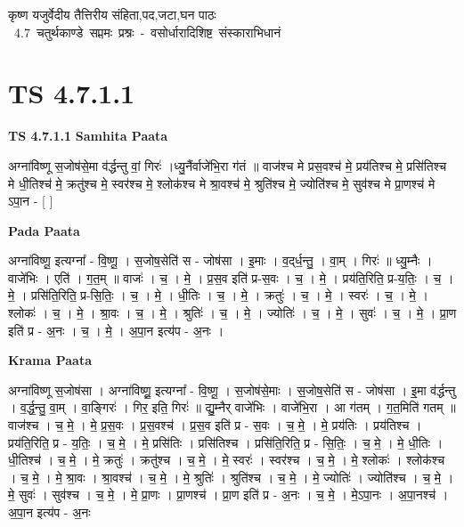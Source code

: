 \documentclass[17pt]{extarticle}
\begin{document}
\begin{titlepage}
    \begin{center}
 
\begin{sanskrit}
    { \Large
    कृष्ण यजुर्वेदीय तैत्तिरीय संहिता,पद,जटा,घन पाठः 
    }
    \\
    \vspace{2.5cm}
    \mbox{ \Large
    4.7     चतुर्थकाण्डे सप्तमः प्रश्नः - वसोर्धारादिशिष्ट संस्काराभिधानं   }
\end{sanskrit}
\end{center}

\end{titlepage}
\tableofcontents
{}
\pagebreak


\section{ TS 4.7.1.1 }

\textbf{TS 4.7.1.1 } \newline
\textbf{Samhita Paata} \newline

अग्ना॑विष्णू स॒जोष॑से॒मा व॑र्द्धन्तु वां॒ गिरः॑ ।ध्यु॒नैंर्वाजे॑भि॒रा ग॑तं ॥ वाज॑श्च मे प्रस॒वश्च॑ मे॒ प्रय॑तिश्च मे॒ प्रसि॑तिश्च मे धी॒तिश्च॑ मे॒ क्रतु॑श्च मे॒ स्वर॑श्च मे॒ श्लोक॑श्च मे श्रा॒वश्च॑ मे॒ श्रुति॑श्च मे॒ ज्योति॑श्च मे॒ सुव॑श्च मे प्रा॒णश्च॑ मे ऽपा॒न - [  ] \newline

\textbf{Pada Paata} \newline

अग्ना॑विष्णू॒ इत्यग्ना᳚ - वि॒ष्णू॒ । स॒जोष॒सेति॑ स - जोष॑सा । इ॒माः । व॒द्‌र्ध॒न्तु॒ । वा॒म् । गिरः॑ ॥ ध्यु॒म्नैः । वाजे॑भिः । एति॑ । ग॒त॒म् ॥ वाजः॑ । च॒ । मे॒ । प्र॒स॒व इति॑ प्र-स॒वः । च॒ । मे॒ । प्रय॑ति॒रिति॒ प्र-य॒तिः॒ । च॒ । मे॒ । प्रसि॑ति॒रिति॒ प्र-सि॒तिः॒ । च॒ । मे॒ । धी॒तिः । च॒ । मे॒ । क्रतुः॑ । च॒ । मे॒ । स्वरः॑ । च॒ । मे॒ । श्लोकः॑ । च॒ । मे॒ । श्रा॒वः । च॒ । मे॒ । श्रुतिः॑ । च॒ । मे॒ । ज्योतिः॑ । च॒ । मे॒ । सुवः॑ । च॒ । मे॒ । प्रा॒ण इति॑ प्र - अ॒नः । च॒ । मे॒ । अ॒पा॒न इत्य॑प - अ॒नः ।  \newline


\textbf{Krama Paata} \newline

अग्ना॑विष्णू स॒जोष॑सा । अग्ना॑विष्णू॒॒ इत्यग्ना᳚ - वि॒ष्णू॒ । स॒जोष॑से॒माः । स॒॒जोष॒॒सेति॑ स - जोष॑सा । इ॒॒मा व॑र्द्धन्तु । व॒र्द्ध॒न्तु॒ वा॒म् । वा॒ङ्गिरः॑ । गिर॒ इति॒ गिरः॑ ॥ द्यु॒म्नैर् वाजे॑भिः । वाजे॑भि॒रा । आ ग॑तम् । ग॒त॒मिति॑ गतम् ॥ वाज॑श्च । च॒ मे॒ । मे॒ प्र॒स॒वः । प्र॒स॒वश्च॑ । प्र॒स॒व इति॑ प्र - स॒वः । च॒ मे॒ । मे॒ प्रय॑तिः । प्रय॑तिश्च । प्रय॑ति॒रिति॒ प्र - य॒तिः॒ । च॒ मे॒ । मे॒ प्रसि॑तिः । प्रसि॑तिश्च । प्रसि॑ति॒रिति॒ प्र - सि॒तिः॒ । च॒ मे॒ । मे॒ धी॒तिः । धी॒तिश्च॑ । च॒ मे॒ । मे॒ क्रतुः॑ । क्रतु॑श्च । च॒ मे॒ । मे॒ स्वरः॑ । स्वर॑श्च । 
च॒ मे॒ । मे॒ श्लोकः॑ । श्लोक॑श्च । च॒ मे॒ । मे॒ श्रा॒वः । श्रा॒वश्च॑ । च॒ मे॒ । मे॒ श्रुतिः॑ । श्रुति॑श्च । च॒ मे॒ । मे॒ ज्योतिः॑ । ज्योति॑श्च । च॒ मे॒ । मे॒ सुवः॑ । सुव॑श्च । च॒ मे॒ । मे॒ प्रा॒णः । प्रा॒णश्च॑ । प्रा॒ण इति॑ प्र - अ॒नः । च॒ मे॒ । मे॒ऽपा॒नः । अ॒पा॒नश्च॑ । 
अ॒पा॒न इत्य॑प - अ॒नः \newline
\end{document}
